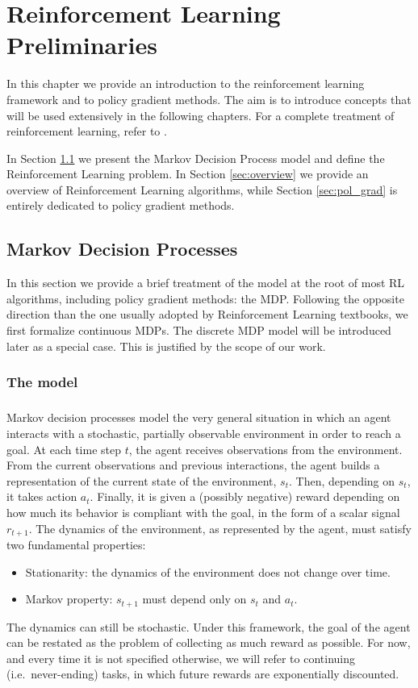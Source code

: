 \chapter{Reinforcement Learning Preliminaries}\label{chap:prelim}
In this chapter we provide an introduction to the reinforcement learning framework and to policy gradient methods.
The aim is to introduce concepts that will be used extensively in the following chapters. For a complete treatment of reinforcement learning, refer to \cite{Sutton:1998:IRL:551283}.

In Section \ref{sec:MDP} we present the Markov Decision Process model and define the Reinforcement Learning problem. In Section \ref{sec:overview} we provide an overview of Reinforcement Learning algorithms, while Section \ref{sec:pol_grad} is entirely dedicated to policy gradient methods.

\section{Markov Decision Processes}\label{sec:MDP}
In this section we provide a brief treatment of the model at the root of most \ac{RL} algorithms, including policy gradient methods: the \ac{MDP}.  
Following the opposite direction than the one usually adopted by Reinforcement Learning textbooks, we first formalize continuous \ac{MDP}s. The discrete \ac{MDP} model will be introduced later as a special case. This is justified by the scope of our work.

\subsection{The model}
\paragraph{} %
Markov decision processes model the very general situation in which an agent interacts with a stochastic, partially observable environment in order to reach a goal. At each time step $t$, the agent receives observations from the environment. From the current observations and previous interactions, the agent builds a representation of the current state of the environment, $s_t$. Then, depending on $s_t$, it takes action $a_t$. Finally, it is given a (possibly negative) reward depending on how much its behavior is compliant with the goal, in the form of a scalar signal $r_{t+1}$. The dynamics of the environment, as represented by the agent, must satisfy two fundamental properties:
\begin{itemize}
\item Stationarity: the dynamics of the environment does not change over time.
\item Markov property: $s_{t+1}$ must depend only on $s_t$ and $a_t$.
\end{itemize}
The dynamics can still be stochastic.
Under this framework, the goal of the agent can be restated as the problem of collecting as much reward as possible. For now, and every time it is not specified otherwise, we will refer to continuing (i.e.\ never-ending) tasks, in which future rewards are exponentially discounted.

